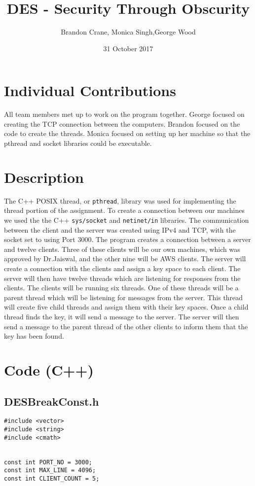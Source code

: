 \documentclass[11pt]{article}
\title{DES - Security Through Obscurity}
\author{Brandon Crane, Monica Singh,George Wood}
\date{31 October 2017}
\begin{document}
\maketitle

\thispagestyle{empty}

\section{Individual Contributions}
All team members met up to work on the program together. George focused on creating the TCP connection between the computers. Brandon focused on the code to create the threads.
Monica focused on setting up her machine so that the pthread and socket libraries
could be executable.

\section{Description}
The C++ POSIX thread, or \texttt{pthread}, library was used for implementing the thread portion of the assignment. To create a connection between our machines we used the the C++ \texttt{sys/socket} and  \texttt{netinet/in}  libraries. The communication between the client and the server was created using IPv4 and TCP, with the socket set to using Port 3000. The program creates a connection between a server and twelve clients. Three of these clients will be our own machines, which was approved by Dr.Jaiswal, and the other nine will be AWS clients. The server will create a connection with the clients and assign a key space to each client. The server will then have twelve threads which are listening for responses from the clients. The clients will be running six threads. One of these threads will be a parent thread which will be listening for messages from the server. This thread will create five child threads and assign them with their key spaces. Once a child thread finds the key, it will send a message to the server. The server will then send a message to the parent thread of the other clients to inform them that the key has been found.


\section{Code (C++)}
\subsection{DESBreakConst.h}
\begin{verbatim}
#include <vector>
#include <string>
#include <cmath>


const int PORT_NO = 3000;
const int MAX_LINE = 4096;
const int CLIENT_COUNT = 5;

\end{verbatim}
\end{document}
